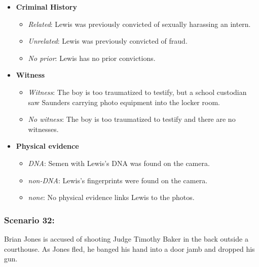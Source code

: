 \documentclass[
]{article}
\providecommand{\tightlist}{%
  \setlength{\itemsep}{0pt}\setlength{\parskip}{0pt}}
\begin{document}
\begin{itemize}
\tightlist
\item
  \textbf{Criminal History}

  \begin{itemize}
  \tightlist
  \item
    \emph{Related}: Lewis was previously convicted of sexually harassing
    an intern.
  \item
    \emph{Unrelated}: Lewis was previously convicted of fraud.
  \item
    \emph{No prior}: Lewis has no prior convictions.
  \end{itemize}
\item
  \textbf{Witness}

  \begin{itemize}
  \tightlist
  \item
    \emph{Witness}: The boy is too traumatized to testify, but a school
    custodian saw Saunders carrying photo equipment into the locker
    room.
  \item
    \emph{No witness}: The boy is too traumatized to testify and there
    are no witnesses.
  \end{itemize}
\item
  \textbf{Physical evidence}

  \begin{itemize}
  \tightlist
  \item
    \emph{DNA}: Semen with Lewis's DNA was found on the camera.
  \item
    \emph{non-DNA}: Lewis's fingerprints were found on the camera.
  \item
    \emph{none}: No physical evidence links Lewis to the photos.
  \end{itemize}
\end{itemize}

\hypertarget{scenario-32}{%
\subsubsection{Scenario 32:}\label{scenario-32}}

Brian Jones is accused of shooting Judge Timothy Baker in the back
outside a courthouse. As Jones fled, he banged his hand into a door jamb
and dropped his gun.
\end{document}
